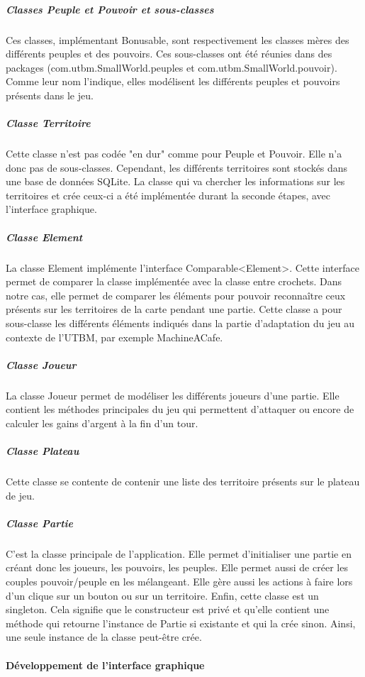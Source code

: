 \documentclass[a4paper, 11pt]{article}
\begin{document}
			 	\subparagraph{Classes Peuple et Pouvoir et sous-classes}
			 	Ces classes, implémentant Bonusable, sont respectivement les classes mères des différents peuples et des pouvoirs. Ces sous-classes ont été réunies dans des packages (com.utbm.SmallWorld.peuples et com.utbm.SmallWorld.pouvoir). Comme leur nom l'indique, elles modélisent les différents peuples et pouvoirs présents dans le jeu.
			 	
			 	\subparagraph{Classe Territoire}
			 	Cette classe n'est pas codée "en dur" comme pour Peuple et Pouvoir. Elle n'a donc pas de sous-classes. Cependant, les différents territoires sont stockés dans une base de données SQLite. La classe qui va chercher les informations sur les territoires et crée ceux-ci a été implémentée durant la seconde étapes, avec l'interface graphique.
			 	
			 	\subparagraph{Classe Element}
			 	La classe Element implémente l'interface Comparable<Element>. Cette interface permet de comparer la classe implémentée avec la classe entre crochets. Dans notre cas, elle permet de comparer les éléments pour pouvoir reconnaître ceux présents sur les territoires de la carte pendant une partie. Cette classe a pour sous-classe les différents éléments indiqués dans la partie d'adaptation du jeu au contexte de l'UTBM, par exemple MachineACafe.
			 	
			 	\subparagraph{Classe Joueur}
			 	La classe Joueur permet de modéliser les différents joueurs d'une partie. Elle contient les méthodes principales du jeu qui permettent d'attaquer ou encore de calculer les gains d'argent à la fin d'un tour.
			 	
			 	\subparagraph{Classe Plateau}
			 	Cette classe se contente de contenir une liste des territoire présents sur le plateau de jeu.
			 	
			 	\subparagraph{Classe Partie}
			 	C'est la classe principale de l'application. Elle permet d'initialiser une partie en créant donc les joueurs, les pouvoirs, les peuples. Elle permet aussi de créer les couples pouvoir/peuple en les mélangeant. Elle gère aussi les actions à faire lors d'un clique sur un bouton ou sur un territoire. Enfin, cette classe est un singleton. Cela signifie que le constructeur est privé et qu'elle contient une méthode qui retourne l'instance de Partie si existante et qui la crée sinon. Ainsi, une seule instance de la classe peut-être crée.
			 	
			 	
			 \paragraph{Développement de l'interface graphique\\}
			 
\end{document}
